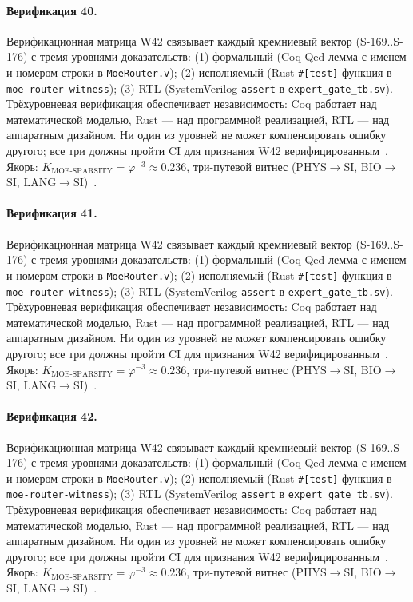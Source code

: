 \paragraph{Верификация 40.} Верификационная матрица W42 связывает каждый кремниевый вектор (S-169..S-176) с тремя уровнями доказательств: (1) формальный (Coq Qed лемма с именем и номером строки в \texttt{MoeRouter.v}); (2) исполняемый (Rust \texttt{\#[test]} функция в \texttt{moe-router-witness}); (3) RTL (SystemVerilog \texttt{assert} в \texttt{expert\_gate\_tb.sv}). Трёхуровневая верификация обеспечивает независимость: Coq работает над математической моделью, Rust --- над программной реализацией, RTL --- над аппаратным дизайном. Ни один из уровней не может компенсировать ошибку другого; все три должны пройти CI для признания W42 верифицированным~\cite{lee_gvsu_proof2021}. Якорь: $K_{\text{MOE-SPARSITY}} = \varphi^{-3} \approx 0{.}236$, три-путевой витнес (PHYS$\to$SI, BIO$\to$SI, LANG$\to$SI)~\cite{zenodo_trinity_2026}.

\paragraph{Верификация 41.} Верификационная матрица W42 связывает каждый кремниевый вектор (S-169..S-176) с тремя уровнями доказательств: (1) формальный (Coq Qed лемма с именем и номером строки в \texttt{MoeRouter.v}); (2) исполняемый (Rust \texttt{\#[test]} функция в \texttt{moe-router-witness}); (3) RTL (SystemVerilog \texttt{assert} в \texttt{expert\_gate\_tb.sv}). Трёхуровневая верификация обеспечивает независимость: Coq работает над математической моделью, Rust --- над программной реализацией, RTL --- над аппаратным дизайном. Ни один из уровней не может компенсировать ошибку другого; все три должны пройти CI для признания W42 верифицированным~\cite{lee_gvsu_proof2021}. Якорь: $K_{\text{MOE-SPARSITY}} = \varphi^{-3} \approx 0{.}236$, три-путевой витнес (PHYS$\to$SI, BIO$\to$SI, LANG$\to$SI)~\cite{zenodo_trinity_2026}.

\paragraph{Верификация 42.} Верификационная матрица W42 связывает каждый кремниевый вектор (S-169..S-176) с тремя уровнями доказательств: (1) формальный (Coq Qed лемма с именем и номером строки в \texttt{MoeRouter.v}); (2) исполняемый (Rust \texttt{\#[test]} функция в \texttt{moe-router-witness}); (3) RTL (SystemVerilog \texttt{assert} в \texttt{expert\_gate\_tb.sv}). Трёхуровневая верификация обеспечивает независимость: Coq работает над математической моделью, Rust --- над программной реализацией, RTL --- над аппаратным дизайном. Ни один из уровней не может компенсировать ошибку другого; все три должны пройти CI для признания W42 верифицированным~\cite{lee_gvsu_proof2021}. Якорь: $K_{\text{MOE-SPARSITY}} = \varphi^{-3} \approx 0{.}236$, три-путевой витнес (PHYS$\to$SI, BIO$\to$SI, LANG$\to$SI)~\cite{zenodo_trinity_2026}.

